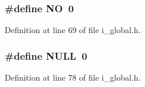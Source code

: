 \subsubsection{\setlength{\rightskip}{0pt plus 5cm}\#define NO~0}\label{i__global_8h_996bde01ecac342918f0a2c4e7ce7bd5}




Definition at line 69 of file i\_\-global.h.
\subsubsection{\setlength{\rightskip}{0pt plus 5cm}\#define NULL~0}\label{i__global_8h_070d2ce7b6bb7e5c05602aa8c308d0c4}




Definition at line 78 of file i\_\-global.h.

